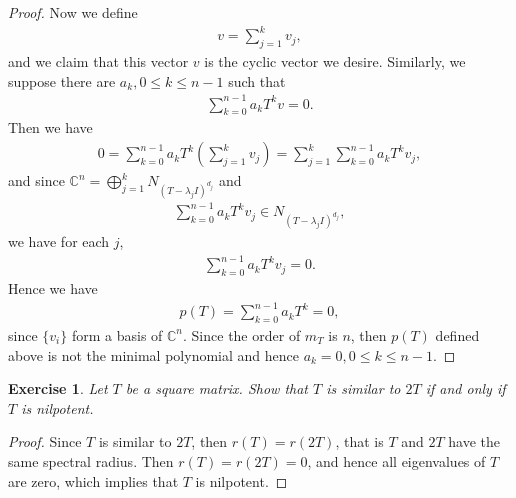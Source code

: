 \documentclass[11pt]{book}
\newtheorem{exercise}{Exercise}[section]
\theoremstyle{definition}
\numberwithin{equation}{chapter}
\begin{document}
\begin{proof}
Now we define 
\begin{align*}
    v = \sum^k_{j=1} v_j,
\end{align*}
and we claim that this vector $v$ is the cyclic vector we desire. Similarly, we suppose there are $a_k, 0 \leq k \leq n - 1$ such that
\begin{align*}
    \sum^{n-1}_{k=0} a_k T^k v = 0.
\end{align*}
Then we have 
\begin{align*}
    0 = \sum^{n-1}_{k=0} a_k T^k \left(\sum^k_{j=1} v_j\right) = \sum^k_{j=1} \sum^{n-1}_{k=0} a_k T^k v_j,
\end{align*}
and since $\mathbb{C}^n = \bigoplus^k_{j=1} N_{(T-\lambda_j I)^{d_j}}$ and 
\begin{align*}
    \sum^{n-1}_{k=0} a_k T^k v_j \in N_{(T-\lambda_j I)^{d_j}},
\end{align*}
we have for each $j$,
\begin{align*}
    \sum^{n-1}_{k=0} a_k T^k v_j = 0.
\end{align*}
Hence we have
\begin{align*}
    p(T) = \sum^{n-1}_{k=0} a_k T^k = 0,
\end{align*}
since $\{v_i\}$ form a basis of $\mathbb{C}^n$. Since the order of $m_T$ is $n$, then $p(T)$ defined above is not the minimal polynomial and hence $a_k = 0, 0 \leq k \leq n - 1$. 
\end{proof}

\medskip

\begin{exercise}
Let $T$ be a square matrix. Show that $T$ is similar to $2T$ if and only if $T$ is nilpotent.
\end{exercise}
\begin{proof}
Since $T$ is similar to $2T$, then $r(T) = r(2T)$, that is $T$ and $2T$ have the same spectral radius. Then $r(T) = r(2T) = 0$, and hence all eigenvalues of $T$ are zero, which implies that $T$ is nilpotent.
\end{proof}

\medskip
\end{document}
